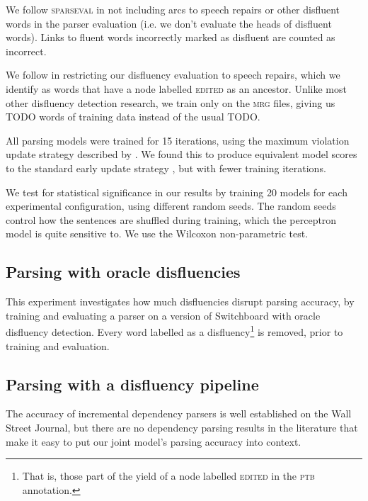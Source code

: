 \documentclass[11pt,letterpaper]{article}
\newcommand{\sparseval}{\textsc{sparseval}\xspace}
\begin{document}
We follow \sparseval in not including arcs to speech repairs or other disfluent
words in the parser evaluation (i.e. we don't evaluate the heads of disfluent
words).  Links to fluent words incorrectly marked as disfluent are counted as
incorrect.

We follow \citet{Johnson04a} in restricting our disfluency evaluation to speech
repairs, which we identify as words that have a node labelled \textsc{edited}
as an ancestor.  Unlike most other disfluency detection research, we train only
on the \textsc{mrg} files, giving us TODO words of training data instead of
the usual TODO.

All parsing models were trained for 15 iterations, using the maximum violation
update strategy described by \citet{huang:12}.  We found this to produce equivalent
model scores to the standard early update strategy \citep{collins:02}, but with
fewer training iterations.

We test for statistical significance in our results by training 20 models for
each experimental configuration, using different random seeds. The random seeds
control how the sentences are shuffled during training, which the perceptron
model is quite sensitive to.  We use the Wilcoxon non-parametric test.

\subsection{Parsing with oracle disfluencies}

\label{sec:oracle}
This experiment investigates how much disfluencies disrupt parsing accuracy,
by training and evaluating a parser on a version of Switchboard with oracle
disfluency detection.  Every word labelled as a disfluency\footnote{That is, those
part of the yield of a node labelled \textsc{edited} in the \textsc{ptb} annotation.}
is removed, prior to training and evaluation.

\subsection{Parsing with a disfluency pipeline}
\label{sec:pipeline}
The accuracy of incremental dependency parsers is well established on the Wall
Street Journal, but there are no dependency parsing results in the literature
that make it easy to put our joint model's parsing accuracy into context.
\end{document}

